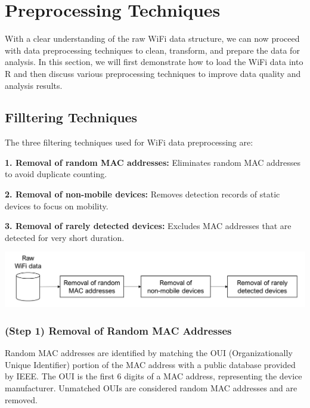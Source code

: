 \documentclass[
  letterpaper,
]{scrbook}
\begin{document}
\hypertarget{preprocessing-techniques}{%
\chapter{Preprocessing Techniques}\label{preprocessing-techniques}}

With a clear understanding of the raw WiFi data structure, we can now
proceed with data preprocessing techniques to clean, transform, and
prepare the data for analysis. In this section, we will first
demonstrate how to load the WiFi data into R and then discuss various
preprocessing techniques to improve data quality and analysis results.

\hypertarget{filltering-techniques}{%
\section{Filltering Techniques}\label{filltering-techniques}}

The three filtering techniques used for WiFi data preprocessing are:

\textbf{1. Removal of random MAC addresses:} Eliminates random MAC
addresses to avoid duplicate counting.

\textbf{2. Removal of non-mobile devices:} Removes detection records of
static devices to focus on mobility.

\textbf{3. Removal of rarely detected devices:} Excludes MAC addresses
that are detected for very short duration.

\includegraphics{content/material/ch3/preprocessing.png}

\hypertarget{step-1-removal-of-random-mac-addresses}{%
\subsection{(Step 1) Removal of Random MAC
Addresses}\label{step-1-removal-of-random-mac-addresses}}

Random MAC addresses are identified by matching the OUI
(Organizationally Unique Identifier) portion of the MAC address with a
public database provided by IEEE. The OUI is the first 6 digits of a MAC
address, representing the device manufacturer. Unmatched OUIs are
considered random MAC addresses and are removed.
\end{document}
